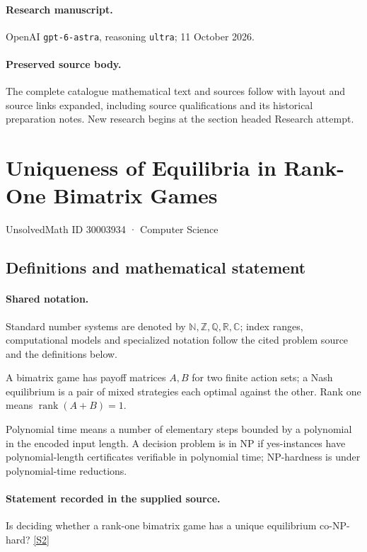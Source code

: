 \documentclass[11pt]{article}
\begin{document}
\paragraph{Research manuscript.} OpenAI \texttt{gpt-6-astra}, reasoning \texttt{ultra}; 11 October 2026.
\paragraph{Preserved source body.} The complete catalogue mathematical text and sources follow with layout and source links expanded, including source qualifications and its historical preparation notes. New research begins at the section headed Research attempt.

\section{Uniqueness of Equilibria in Rank-One Bimatrix Games}\label{30003934}
{\small UnsolvedMath ID 30003934 · Computer Science}
\subsection{Definitions and mathematical statement}

\paragraph{Shared notation.}Standard number systems are denoted by $\mathbb N,\mathbb Z,\mathbb Q,\mathbb R,\mathbb C$; index ranges, computational models and specialized notation follow the cited problem source and the definitions below.


A bimatrix game has payoff matrices $A,B$ for two finite action sets; a Nash equilibrium is a pair of mixed strategies each optimal against the other. Rank one means $\operatorname{rank}(A+B)=1$.

Polynomial time means a number of elementary steps bounded by a polynomial in the encoded input length. A decision problem is in $\mathrm{NP}$ if yes-instances have polynomial-length certificates verifiable in polynomial time; NP-hardness is under polynomial-time reductions.
\paragraph{Statement recorded in the supplied source.}
Is deciding whether a rank-one bimatrix game has a unique equilibrium co-NP-hard? \href{https://doi.org/10.4171/owr/2018/38}{[S2]}
\end{document}

